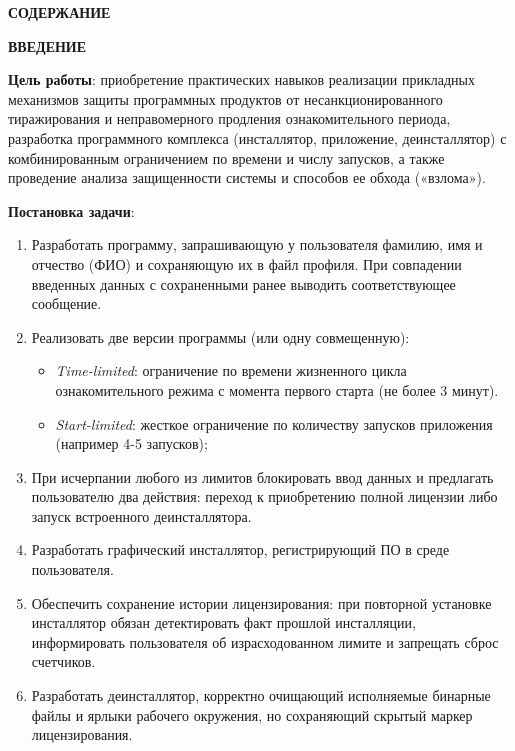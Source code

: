 \documentclass[a4paper]{article}
\begin{document}
\newpage
\pagestyle{plain}
\setcounter{page}{2}

\begin{center}
    {\bfseries \MakeUppercase{Содержание}}
\end{center}
\vspace{-0.5cm}
\tableofcontents

\newpage
\begin{center}
    {\bfseries \MakeUppercase{Введение}}
\end{center}

\textbf{Цель работы}: приобретение практических навыков реализации прикладных механизмов защиты программных продуктов от несанкционированного тиражирования и неправомерного продления ознакомительного периода, разработка программного комплекса (инсталлятор, приложение, деинсталлятор) с комбинированным ограничением по времени и числу запусков, а также проведение анализа защищенности системы и способов ее обхода («взлома»).

\textbf{Постановка задачи}:
\begin{enumerate}
    \item Разработать программу, запрашивающую у пользователя фамилию, имя и отчество (ФИО) и сохраняющую их в файл профиля. При совпадении введенных данных с сохраненными ранее выводить соответствующее сообщение.
    \item Реализовать две версии программы (или одну совмещенную):
          \begin{itemize}
              \item \textit{Time-limited}: ограничение по времени жизненного цикла ознакомительного режима с момента первого старта (не более 3 минут).
              \item \textit{Start-limited}: жесткое ограничение по количеству запусков приложения (например 4-5 запусков);
          \end{itemize}
    \item При исчерпании любого из лимитов блокировать ввод данных и предлагать пользователю два действия: переход к приобретению полной лицензии либо запуск встроенного деинсталлятора.
    \item Разработать графический инсталлятор, регистрирующий ПО в среде пользователя.
    \item Обеспечить сохранение истории лицензирования: при повторной установке инсталлятор обязан детектировать факт прошлой инсталляции, информировать пользователя об израсходованном лимите и запрещать сброс счетчиков.
    \item Разработать деинсталлятор, корректно очищающий исполняемые бинарные файлы и ярлыки рабочего окружения, но сохраняющий скрытый маркер лицензирования.
\end{enumerate}
\end{document}
